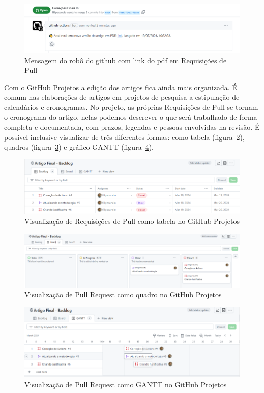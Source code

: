 \begin{figure}[H]
	\centering
	\includegraphics[width=.6\textwidth]{./images/fig06.png}
	\caption{Mensagem do robô do github com link do pdf em Requisições de Pull}
	\label{fig:fig06}
\end{figure}

Com o GitHub Projetos a edição dos artigos fica ainda mais organizada. É comum nas elaborações de artigos em projetos de pesquisa a estipulação de calendários e cronogramas. No projeto, as próprias Requisições de Pull se tornam o cronograma do artigo, nelas podemos descrever o que será trabalhado de forma completa e documentada, com prazos, legendas e pessoas envolvidas na revisão. É possível inclusive visualizar de três diferentes formas: como tabela (figura~\ref{fig:fig07}), quadros (figura~\ref{fig:fig08}) e gráfico GANTT (figura~\ref{fig:fig09}).

\begin{figure}[H]
	\centering
	\includegraphics[width=.8\textwidth]{./images/fig07.png}
	\caption{Visualização de Requisições de Pull como tabela no GitHub Projetos}
	\label{fig:fig07}
\end{figure}

\begin{figure}[ht]
	\centering
	\includegraphics[width=.8\textwidth]{./images/fig08.png}
	\caption{Visualização de Pull Request como quadro no GitHub Projetos}
	\label{fig:fig08}
\end{figure}

\begin{figure}[ht]
	\centering
	\includegraphics[width=.8\textwidth]{./images/fig09.png}
	\caption{Visualização de Pull Request como GANTT no GitHub Projetos}
	\label{fig:fig09}
\end{figure}

